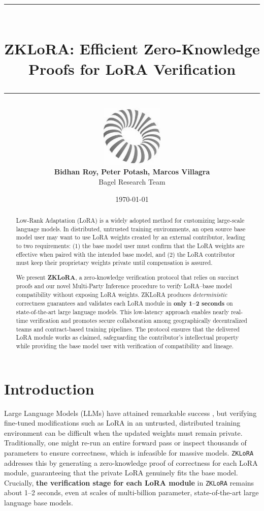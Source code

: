 \documentclass[11pt]{article}
\title{
    \vspace*{-1.5em}
    \rule{\textwidth}{0.4pt} \\[0.4em]
    \textbf{ZKLoRA: Efficient Zero-Knowledge Proofs for LoRA Verification} \\[0.4em]
    \rule{\textwidth}{0.4pt}
}
\author{ \includegraphics[height=8em]{figs/bagel-logo-bw.png} \\
    \textbf{Bidhan Roy, Peter Potash, Marcos Villagra} \\
    Bagel Research Team\footnotemark[1] \\
}
\date{\today}
\begin{document}
\maketitle


\begin{abstract}
  Low-Rank Adaptation (LoRA) is a widely adopted method for customizing large-scale language models. In distributed, untrusted training environments, an open source base model user may want to use LoRA weights created by an external contributor, leading to two requirements: (1) the base model user must confirm that the LoRA weights are effective when paired with the intended base model, and (2) the LoRA contributor must keep their proprietary weights private until compensation is assured.

  We present \textbf{ZKLoRA}, a zero-knowledge verification protocol that relies on succinct proofs and our novel Multi-Party Inference procedure to verify LoRA–base model compatibility without exposing LoRA weights. ZKLoRA produces \emph{deterministic} correctness guarantees and validates each LoRA module in \textbf{only 1--2 seconds} on state-of-the-art large language models. This low-latency approach enables nearly real-time verification and promotes secure collaboration among geographically decentralized teams and contract-based training pipelines. The protocol ensures that the delivered LoRA module works as claimed, safeguarding the contributor’s intellectual property while providing the base model user with verification of compatibility and lineage.
\end{abstract}

\section{Introduction}
Large Language Models (LLMs) have attained remarkable success \cite{brown2020language, devlin2018bert}, but verifying fine-tuned modifications such as LoRA \cite{hu2021lora} in an untrusted, distributed training environment can be difficult when the updated weights must remain private. 
Traditionally, one might re-run an entire forward pass or inspect thousands of parameters to ensure correctness, which is infeasible for massive models. 
\texttt{ZKLoRA} addresses this by generating a zero-knowledge proof of correctness for each LoRA module, guaranteeing that the private LoRA genuinely fits the base model. 
Crucially, \textbf{the verification stage for each LoRA module} in \texttt{ZKLoRA} remains about 1--2 seconds, even at scales of multi-billion parameter, state-of-the-art large language base models.
\end{document}
